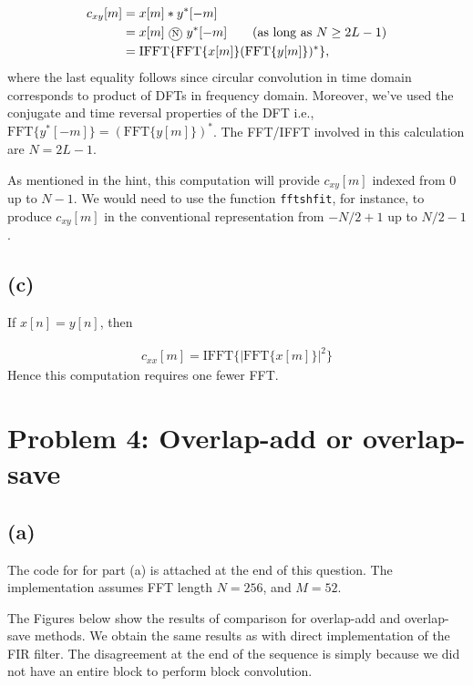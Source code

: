 \documentclass{article}
\begin{document}
\begin{align*}
	c_{xy}[m] &= x[m] \ast y^*[-m] \\
	&= x[m]~\encircle{N}~y^*[-m] \tag{as long as $N \geq 2L - 1$} \\
	&= \mathrm{IFFT}\{\mathrm{FFT}\{x[m]\}(\mathrm{FFT}\{y[m]\})^*\} ,
\end{align*}
where the last equality follows since circular convolution in time domain corresponds to product of DFTs in frequency domain. Moreover, we've used the conjugate and time reversal properties of the DFT i.e., $\mathrm{FFT}\{y^*[-m]\} = (\mathrm{FFT}\{y[m]\})^*$. The FFT/IFFT involved in this calculation are $N = 2L-1$.

As mentioned in the hint, this computation will provide $c_{xy}[m]$ indexed from $0$ up to $N-1$. We would need to use the function \texttt{fftshfit}, for instance, to produce $c_{xy}[m]$ in the conventional representation from $-N/2+1$ up to $N/2-1$.

\subsection{(c)}

If $x[n] = y[n]$, then 

\begin{align}
c_{xx}[m] = \mathrm{IFFT}\{|\mathrm{FFT}\{x[m]\}|^2\}
\end{align}
Hence this computation requires one fewer FFT.

\section{Problem 4: Overlap-add or overlap-save}	
\subsection{(a)}

The code for for part (a) is attached at the end of this question. The implementation assumes FFT length $N = 256$, and $M = 52$.

The Figures below show the results of comparison for overlap-add and overlap-save methods. We obtain the same results as with direct implementation of the FIR filter. The disagreement at the end of the sequence is simply because we did not have an entire block to perform block convolution. 
\end{document}
